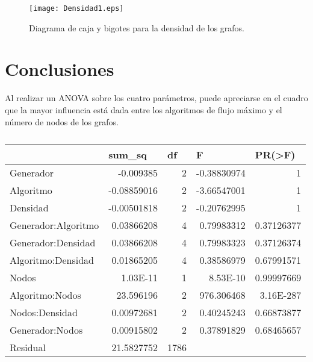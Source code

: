 \documentclass{article}
\begin{document}
\begin{figure}
\begin{center}
  \texttt{[image: Densidad1.eps]}
\end{center}
\vspace*{-8mm}
\caption{Diagrama de caja y bigotes para la densidad de los grafos.}
  \label{Figura 6} 
\end{figure}

\section*{Conclusiones}

Al realizar un ANOVA sobre los cuatro parámetros, puede apreciarse en el cuadro \pageref{Cuadro 5} que la mayor influencia está dada entre los algoritmos de flujo máximo y el número de nodos de los grafos.

\begin{table}[htbp]
  \centering
  \caption{}
    \begin{tabular}{|l|r|r|r|r|}
    \toprule
    \rowcolor[rgb]{ .357,  .608,  .835}       & \multicolumn{1}{l|}{\textbf{sum\_sq}} & \multicolumn{1}{l|}{\textbf{df}} & \multicolumn{1}{l|}{\textbf{F}} & \multicolumn{1}{l|}{\textbf{PR(>F)}} \\
    \midrule
    Generador & -0.009385 & 2     & -0.38830974 & 1 \\
    \midrule
    Algoritmo & -0.08859016 & 2     & -3.66547001 & 1 \\
    \midrule
    Densidad & -0.00501818 & 2     & -0.20762995 & 1 \\
    \midrule
    Generador:Algoritmo & 0.03866208 & 4     & 0.79983312 & 0.37126377 \\
    \midrule
    Generador:Densidad & 0.03866208 & 4     & 0.79983323 & 0.37126374 \\
    \midrule
    Algoritmo:Densidad & 0.01865205 & 4     & 0.38586979 & 0.67991571 \\
    \midrule
    Nodos & 1.03E-11 & 1     & 8.53E-10 & 0.99997669 \\
    \midrule
    Algoritmo:Nodos & 23.596196 & 2     & 976.306468 & 3.16E-287 \\
    \midrule
    Nodos:Densidad & 0.00972681 & 2     & 0.40245243 & 0.66873877 \\
    \midrule
    Generador:Nodos & 0.00915802 & 2     & 0.37891829 & 0.68465657 \\
    \midrule
    Residual & 21.5827752 & 1786  &       &  \\
    \bottomrule
    \end{tabular}%
  \label{tab:Cuadro 5}%
\end{table}%

\newpage


\end{document}
